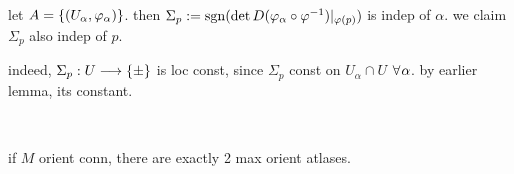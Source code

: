 \begin{pf}[source=Primary Source Material]
	let $A=\left\{{(U_{\alpha},\varphi_{\alpha})}\right\}$. then $\Sigma_{p}:= \operatorname{sgn}(\det D(\varphi_{\alpha}\circ\varphi^{-1})\rvert_{\varphi(p)})$
	is indep of $\alpha$. we claim $\Sigma_{p}$ also indep of $p$.

	indeed, $\Sigma_{p}:U\longrightarrow\left\{{\pm}\right\}$ is loc const, since
	$\Sigma_{p}$ const on $U_{\alpha}\cap U$ $\fa\alpha$.
	by earlier lemma, its constant.
\end{pf} \

\begin{crll}
    if $M$ orient conn, there are exactly 2 max orient atlases.
\end{crll}



